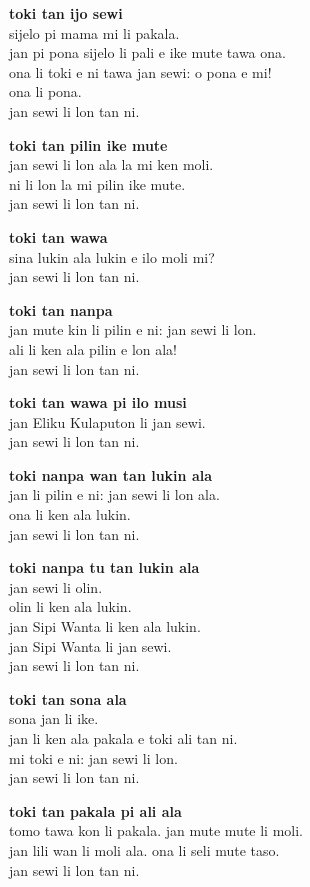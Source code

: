 \textbf{toki tan ijo sewi}   \\
sijelo pi mama mi li pakala.   \\
jan pi pona sijelo li pali e ike mute tawa ona.   \\
ona li toki e ni tawa jan sewi: o pona e mi!   \\
ona li pona.   \\
jan sewi li lon tan ni.

\textbf{toki tan pilin ike mute}   \\
jan sewi li lon ala la mi ken moli.   \\
ni li lon la mi pilin ike mute.   \\
jan sewi li lon tan ni.

\textbf{toki tan wawa}   \\
sina lukin ala lukin e ilo moli mi?   \\
jan sewi li lon tan ni.

\textbf{toki tan nanpa}   \\
jan mute kin li pilin e ni: jan sewi li lon.   \\
ali li ken ala pilin e lon ala!   \\
jan sewi li lon tan ni.

\textbf{toki tan wawa pi ilo musi}   \\
jan Eliku Kulaputon li jan sewi.  \\
jan sewi li lon tan ni.

\textbf{toki nanpa wan tan lukin ala }   \\
jan li pilin e ni: jan sewi li lon ala.   \\
ona li ken ala lukin.   \\
jan sewi li lon tan ni.

\textbf{toki nanpa tu tan lukin ala}   \\
jan sewi li olin.   \\
olin li ken ala lukin.   \\
jan Sipi Wanta li ken ala lukin.  \\
jan Sipi Wanta li jan sewi.   \\
jan sewi li lon tan ni.

\textbf{toki tan sona ala}   \\
sona jan li ike.   \\
jan li ken ala pakala e toki ali tan ni.   \\
mi toki e ni: jan sewi li lon.   \\
jan sewi li lon tan ni.

\textbf{toki tan pakala pi ali ala}   \\
tomo tawa kon li pakala. jan mute mute li moli.   \\
jan lili wan li moli ala. ona li seli mute taso.   \\
jan sewi li lon tan ni.

